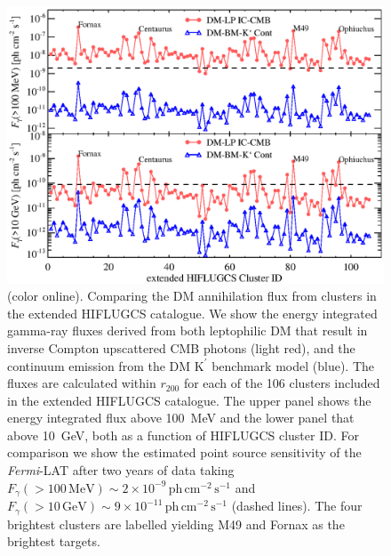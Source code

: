 \documentclass[10pt,aps,pra,reprint,amsmath,amsfonts,amssymb,showpacs,nofootinbib,floatfix]{revtex4-1}
\newcommand{\Fermi}{{\em Fermi}\xspace}
\newcommand{\rmn}{\mathrm}
\newcommand{\Kp}{\rmn{K}^\prime}
\newcommand{\colo}{(color online). }
\newcommand{\rvir}{r_{200}}
\begin{document}
\begin{figure}%
\begin{minipage}{2.0\columnwidth}
 \includegraphics[width=0.99\columnwidth]{figures/Flux.comp.DM.eps}
 \caption{\colo Comparing the DM annihilation flux from clusters in
   the extended HIFLUGCS catalogue. We show the energy integrated
   gamma-ray fluxes derived from both leptophilic DM that result in
   inverse Compton upscattered CMB photons (light red), and the
   continuum emission from the DM $\Kp$ benchmark model (blue). The
   fluxes are calculated within $\rvir$ for each of the 106 clusters
   included in the extended HIFLUGCS catalogue. The upper panel shows
   the energy integrated flux above 100~MeV and the lower panel that
   above 10~GeV, both as a function of HIFLUGCS cluster ID. For
   comparison we show the estimated point source sensitivity of the
   \Fermi-LAT after two years of data taking
   $F_\gamma(>100\,\rmn{MeV})\sim 2\times10^{-9}\,\rmn{ph}\,
   \rmn{cm}^{-2}\,\rmn{s}^{-1}$ and $F_\gamma(>10\,\rmn{GeV})\sim
   9\times10^{-11}\,\rmn{ph}\, \rmn{cm}^{-2}\,\rmn{s}^{-1}$ (dashed
   lines). The four brightest clusters are labelled yielding M49 and
   Fornax as the brightest targets.}
 \label{fig21}
\end{minipage}
\end{figure}
\end{document}
